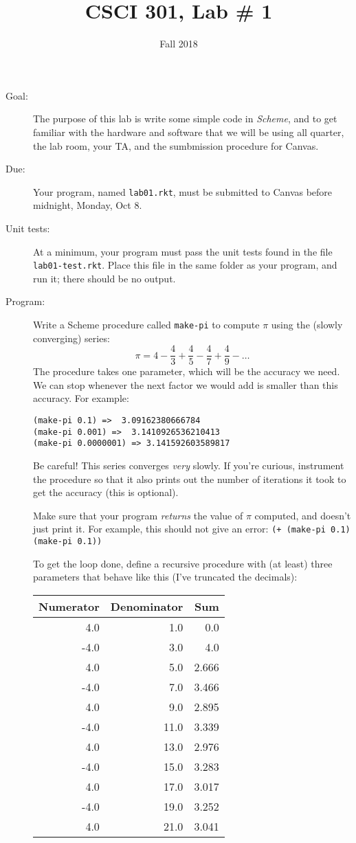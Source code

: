 \documentclass{article}
\title{CSCI 301, Lab \# 1}
\author{Fall 2018}
\date{}
\begin{document}
\maketitle
\begin{multicols}{2}

\begin{description}
\item[Goal:] The purpose of this lab is write some simple code in {\em
  Scheme}, and to get familiar with the hardware and software that we
  will be using all quarter, the lab room, your TA, and the
  sumbmission procedure for Canvas.

\item[Due:] Your program, named {\tt lab01.rkt}, must be submitted to
  Canvas before midnight, Monday, Oct 8.

  \item[Unit tests:]
  At a minimum, your program must pass the unit tests found in the
  file {\tt lab01-test.rkt}.  Place this file in the same folder
  as your program, and run it;  there should be no output.

\item[Program:] Write a {\sc Scheme} procedure called {\tt make-pi} 
to compute $\pi$
  using the (slowly converging) series:
\[
{\pi} = 4 - \frac43 + \frac45 - \frac47 + \frac49 - \ldots
\]
The procedure takes one parameter, which will be the 
accuracy we need.  We can stop whenever the next factor we would
add is smaller than this accuracy.  For example:
\begin{Verbatim}[frame=single]
(make-pi 0.1) =>  3.09162380666784
(make-pi 0.001) =>  3.1410926536210413
(make-pi 0.0000001) => 3.141592603589817
\end{Verbatim}
Be careful!  This series converges {\em very} slowly.  If you're
curious, instrument the procedure so that it also prints out the
number of iterations it took to get the accuracy (this is optional).

Make sure that your program {\em returns} the value of $\pi$ computed,
and doesn't just print it.  For example, this should not give an
error: \verb|(+ (make-pi 0.1) (make-pi 0.1))|


To get the loop done, define a recursive procedure with (at least)
three
parameters that behave like this (I've truncated the decimals):\\
\begin{tabular}{rrr}
 Numerator & Denominator & Sum \\\hline
 4.0 & 1.0 & 0.0\\
 -4.0 & 3.0 & 4.0\\
 4.0 & 5.0 & 2.666\\
 -4.0 & 7.0 & 3.466\\
 4.0 & 9.0 & 2.895\\
 -4.0 & 11.0 & 3.339\\
 4.0 & 13.0 & 2.976\\
 -4.0 & 15.0 & 3.283\\
 4.0 & 17.0 & 3.017\\
 -4.0 & 19.0 & 3.252\\
 4.0 & 21.0 & 3.041\\
\end{tabular}


\end{description}
\end{multicols}
\end{document}
